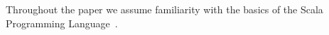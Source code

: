 
Throughout the paper we assume familiarity with the basics of the Scala
Programming Language~\autocite{odersky_scala_2004}.
